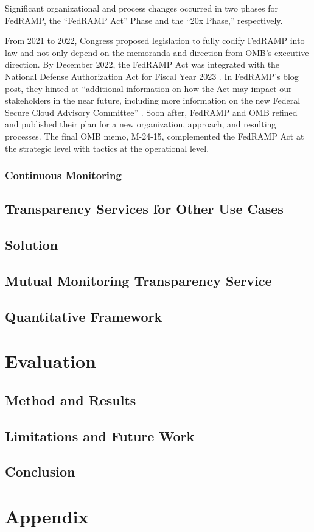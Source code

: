 \documentclass{jdf}
\begin{document}

Significant organizational and process changes occurred in two phases for FedRAMP, the ``FedRAMP Act'' Phase and the ``20x Phase,'' respectively.

From 2021 to 2022, Congress proposed legislation to fully codify FedRAMP into law and not only depend on the memoranda and direction from OMB's executive direction. By December 2022, the FedRAMP Act was integrated with the National Defense Authorization Act for Fiscal Year 2023 \cite{ndaa2023}. In FedRAMP's blog post, they hinted at ``additional information on how the Act may impact our stakeholders in the near future, including more information on the new Federal Secure Cloud Advisory Committee'' \citeyear{fedramp_blog_ndaa2023}. Soon after, FedRAMP and OMB refined and published their plan for a new organization, approach, and resulting processes. The final OMB memo, M-24-15, complemented the FedRAMP Act at the strategic level with tactics at the operational level. 

\subsubsection{Continuous Monitoring}

\subsection{Transparency Services for Other Use Cases}

\subsection{Solution}

\subsection{Mutual Monitoring Transparency Service}

\subsection{Quantitative Framework}

\section{Evaluation}

\subsection{Method and Results}

\subsection{Limitations and Future Work}

\subsection{Conclusion}

\section{Appendix}



\end{document}
